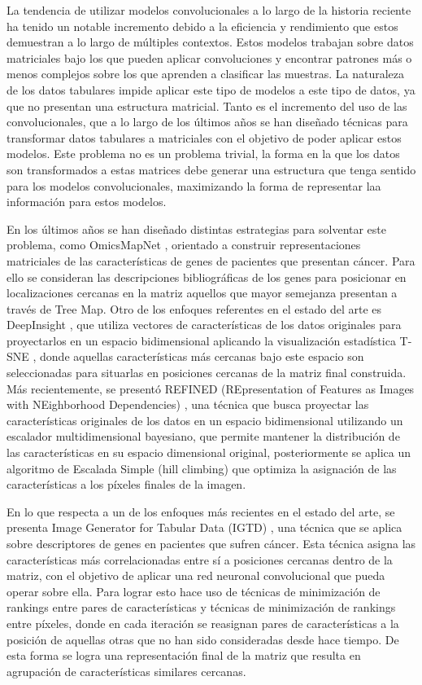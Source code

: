 \documentclass{uathesis-es}
\begin{document}
La tendencia de utilizar modelos convolucionales a lo largo de la historia reciente ha tenido un notable incremento debido a la eficiencia y rendimiento que estos demuestran a lo largo de múltiples contextos. Estos modelos trabajan sobre datos matriciales bajo los que pueden aplicar convoluciones y encontrar patrones más o menos complejos sobre los que aprenden a clasificar las muestras. La naturaleza de los datos tabulares impide aplicar este tipo de modelos a este tipo de datos, ya  que no presentan una estructura matricial. Tanto es el incremento del uso de las convolucionales, que a lo largo de los últimos años se han diseñado técnicas para transformar datos tabulares a matriciales con el objetivo de poder aplicar estos modelos. Este problema no es un problema trivial, la forma en la que los datos son transformados a estas matrices debe generar una estructura que tenga sentido para los modelos convolucionales, maximizando la forma de representar laa información para estos modelos. 

En los últimos años se han diseñado distintas estrategias para solventar este problema, como OmicsMapNet \cite{ma2019omicsmapnet}, orientado a construir representaciones matriciales de las características de genes de pacientes que presentan cáncer. Para ello se consideran las descripciones bibliográficas de los genes para posicionar en localizaciones cercanas en la matriz aquellos que mayor semejanza presentan a través de Tree Map. Otro de los enfoques referentes en el estado del arte es DeepInsight \cite{Sharma2019}, que utiliza vectores de características de los datos originales para proyectarlos en un espacio bidimensional aplicando la visualización estadística T-SNE \cite{van2008visualizing}, donde aquellas características más cercanas bajo este espacio son seleccionadas para situarlas en posiciones cercanas de la matriz final construida. Más recientemente, se presentó REFINED (REpresentation of Features as Images with NEighborhood Dependencies) \cite{Bazgir2020}, una técnica que busca proyectar las características originales de los datos en un espacio bidimensional utilizando un escalador multidimensional bayesiano, que permite mantener la distribución de las características en su espacio dimensional original, posteriormente se aplica un algoritmo de Escalada Simple (hill climbing) que optimiza la asignación de las características a los píxeles finales de la imagen.

En lo que respecta a un de los enfoques más recientes en el estado del arte, se presenta Image Generator for Tabular Data (IGTD) \cite{Zhu2021}, una técnica que se aplica sobre descriptores de genes en pacientes que sufren cáncer. Esta técnica asigna las características más correlacionadas entre sí a posiciones cercanas dentro de la matriz, con el objetivo de aplicar una red neuronal convolucional que pueda operar sobre ella. Para lograr esto hace uso de técnicas de minimización de rankings entre pares de características y técnicas de minimización de rankings entre píxeles, donde en cada iteración se reasignan pares de características a la posición de aquellas otras que no han sido consideradas desde hace tiempo. De esta forma se logra una representación final de la matriz que resulta en agrupación de características similares cercanas.
\end{document}
